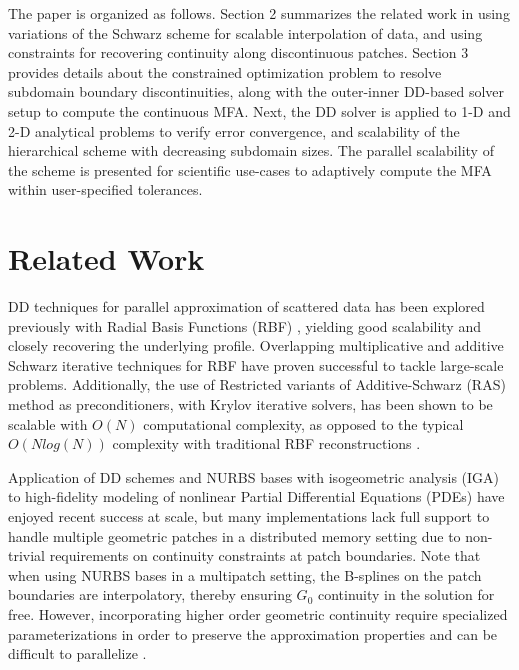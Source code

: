 \documentclass[conference]{IEEEtran}
\begin{document}
The paper is organized as follows. Section 2 summarizes the related work in using variations of the Schwarz scheme for scalable interpolation of data, and using constraints for recovering continuity along discontinuous patches. Section 3 provides details about the constrained optimization problem to resolve subdomain boundary discontinuities, along with the outer-inner DD-based solver setup to compute the continuous MFA. Next, the DD solver is applied to 1-D and 2-D analytical problems to verify error convergence, and scalability of the hierarchical scheme with decreasing subdomain sizes. The parallel scalability of the scheme is presented for scientific use-cases to adaptively compute the MFA within user-specified tolerances.


\section{Related Work}

DD techniques for parallel approximation of scattered data has been explored previously with Radial Basis Functions (RBF) \cite{mai-approx-rbf}, yielding good scalability and closely recovering the underlying profile. Overlapping multiplicative and additive Schwarz \cite{orasm-as-ms-2007} iterative techniques for RBF \cite{ddm-rbf} have proven successful to tackle large-scale problems. Additionally, the use of Restricted variants of Additive-Schwarz (RAS) method as preconditioners, with Krylov iterative solvers, has been shown to be scalable \cite{yokota-rasm-rbf} with $O(N)$ computational complexity, as opposed to the typical $O(N log(N))$ complexity with traditional RBF reconstructions \cite{ddm-rbf-fast}. 

Application of DD schemes and NURBS bases with isogeometric analysis (IGA) to high-fidelity modeling of nonlinear Partial Differential Equations (PDEs) have enjoyed recent success \cite{marini2015parallel, petiga-dalcin-2016} at scale, but many implementations lack full support to handle multiple geometric patches in a distributed memory setting due to non-trivial requirements on continuity constraints at patch boundaries. Note that when using NURBS bases in a multipatch setting, the B-splines on the patch boundaries are interpolatory, thereby ensuring $G_0$ continuity in the solution for free. However, incorporating higher order geometric continuity require specialized parameterizations in order to preserve the approximation properties \cite{kapl2018construction} and can be difficult to parallelize \cite{hofer2018fast}. 
\end{document}
